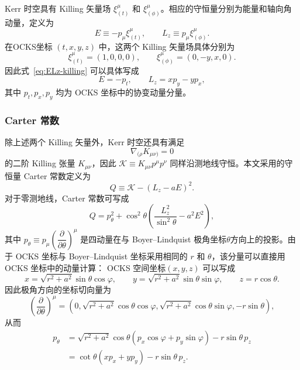 \documentclass[UTF8,11pt,a4paper,fontset=fandol]{ctexart}
\begin{document}
Kerr 时空具有 Killing 矢量场 $\xi_{(t)}^\mu$ 和 $\xi_{(\phi)}^\mu$。相应的守恒量分别为能量和轴向角动量，定义为
\begin{equation}
    E\equiv-p_\mu\xi_{(t)}^\mu,\qquad
    L_z\equiv p_\mu\xi_{(\phi)}^\mu.
    \label{eq:ELz-killing}
\end{equation}
在OCKS坐标 $(t,x,y,z)$ 中，这两个 Killing 矢量场具体分别为
\begin{equation}
    \xi_{(t)}^\mu=(1,0,0,0),\qquad
    \xi_{(\phi)}^\mu=(0,-y,x,0).
\end{equation}
因此式~\eqref{eq:ELz-killing} 可以具体写成
\begin{equation}
    E=-p_t,\qquad L_z=xp_y-yp_x,
    \label{eq:ELz-ocks}
\end{equation}
其中 $p_t,p_x,p_y$ 均为 OCKS 坐标中的协变动量分量。

\subsubsection*{Carter 常数}
除上述两个 Killing 矢量外，Kerr 时空还具有满足
\begin{equation}
    \nabla_{(\rho}K_{\mu\nu)}=0
\end{equation}
的二阶 Killing 张量 $K_{\mu\nu}$，因此
$\mathcal K\equiv K_{\mu\nu}p^\mu p^\nu$
同样沿测地线守恒。本文采用的守恒量 Carter 常数定义为
\begin{equation}
    Q\equiv\mathcal K-(L_z-aE)^2.
    \label{eq:Q-definition}
\end{equation}
对于零测地线，Carter 常数可写成
\begin{equation}
    Q=p_\theta^2+\cos^2\theta
    \left(\frac{L_z^2}{\sin^2\theta}-a^2E^2\right),
    \label{eq:Q-explicit}
\end{equation}
其中
$
    p_\theta\equiv p_\mu
    \left(\dfrac{\partial}{\partial\theta}\right)^\mu
$
是四动量在与 Boyer--Lindquist 极角坐标$\theta$方向上的投影。由于 OCKS 坐标与 Boyer--Lindquist 坐标采用相同的 $r$ 和 $\theta$，该分量可以直接用 OCKS 坐标中的动量计算：
OCKS 空间坐标$(x,y,z)$ 可以写成
\begin{equation}
    x=\sqrt{r^2+a^2}\sin\theta\cos\varphi,\qquad
    y=\sqrt{r^2+a^2}\sin\theta\sin\varphi,\qquad
    z=r\cos\theta.
\end{equation}
因此极角方向的坐标切向量为
\begin{equation}
    \left(\frac{\partial}{\partial\theta}\right)^\mu
    =
    \left(0,\sqrt{r^2+a^2}\cos\theta\cos\varphi,
    \sqrt{r^2+a^2}\cos\theta\sin\varphi,-r\sin\theta\right),
\end{equation}
从而
\begin{align}
    p_\theta
    &=\sqrt{r^2+a^2}\cos\theta
      \left(p_x\cos\varphi+p_y\sin\varphi\right)
      -r\sin\theta\,p_z \nonumber\\
    &=\cot\theta\left(xp_x+yp_y\right)-r\sin\theta\,p_z.
    \label{eq:ptheta-ocks}
\end{align}
\end{document}

